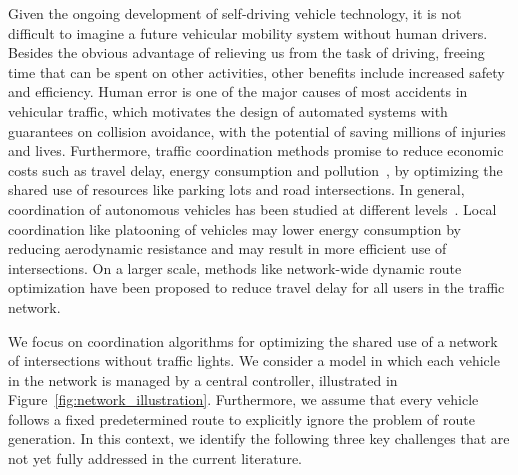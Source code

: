 \documentclass{article}
\theoremstyle{definition}
\theoremstyle{plain}
\begin{document}
Given the ongoing development of self-driving vehicle technology, it is not
difficult to imagine a future vehicular mobility system without human drivers.
Besides the obvious advantage of relieving us from the task of driving, freeing
time that can be spent on other activities, other benefits include
increased safety and efficiency. Human error is one of the major causes of most
accidents in vehicular traffic, which motivates the design of automated systems
with guarantees on collision avoidance, with the potential of saving millions of
injuries and lives. Furthermore, traffic coordination methods promise to reduce
economic costs such as travel delay, energy consumption and pollution~\cite{fagnantPreparingNationAutonomous2015}, by
optimizing the shared use of resources like parking lots and road intersections.
In general, coordination of autonomous vehicles has been studied at different
levels~\cite{marianiCoordinationAutonomousVehicles2022}. Local coordination like platooning of vehicles may lower energy
consumption by reducing aerodynamic resistance and may result in more efficient
use of intersections. On a larger scale, methods like network-wide dynamic route
optimization have been proposed to reduce travel delay for all users in the
traffic network.

We focus on coordination algorithms for optimizing the shared use of a network
of intersections without traffic lights. We consider a model in which each
vehicle in the network is managed by a central controller, illustrated in
Figure~\ref{fig:network_illustration}. Furthermore, we assume that every vehicle follows a
fixed predetermined route to explicitly ignore the problem of route generation.
%
In this context, we identify the following three key challenges
that are not yet fully addressed in the current literature.
\end{document}
